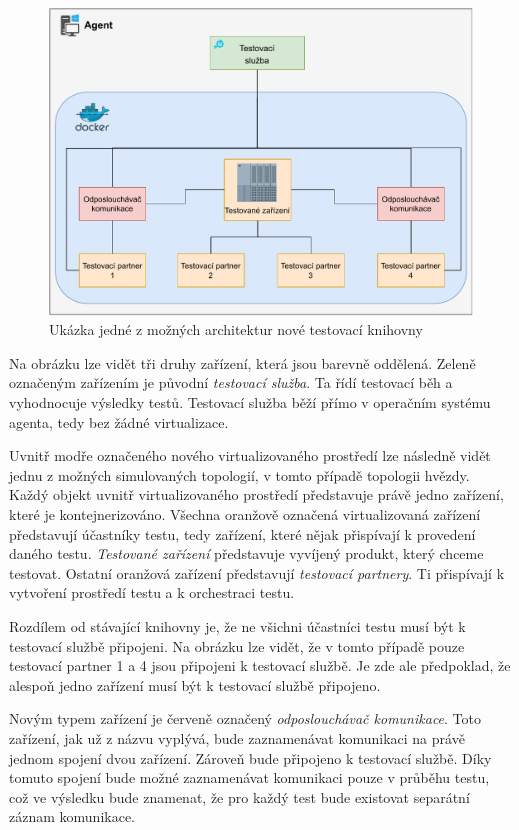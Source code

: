 \begin{figure}[htbp]
    \centering 
    \includegraphics[width=\textwidth]{assets/img/architecture.pdf}
    \caption{Ukázka jedné z možných architektur nové testovací knihovny}
    \label{fig:architecture}
\end{figure}

Na obrázku lze vidět tři druhy zařízení, která jsou barevně oddělená. Zeleně označeným zařízením je původní \textit{testovací služba}. Ta řídí testovací běh a vyhodnocuje výsledky testů. Testovací služba běží přímo v operačním systému agenta, tedy bez žádné virtualizace. 

Uvnitř modře označeného nového virtualizovaného prostředí lze následně vidět jednu z možných simulovaných topologií, v tomto případě topologii hvězdy. Každý objekt uvnitř virtualizovaného prostředí představuje právě jedno zařízení, které je kontejnerizováno. Všechna oranžově označená virtualizovaná zařízení představují účastníky testu, tedy zařízení, které nějak přispívají k provedení daného testu. \textit{Testované zařízení} představuje vyvíjený produkt, který chceme testovat. Ostatní oranžová zařízení představují \textit{testovací partnery}. Ti přispívají k vytvoření prostředí testu a k orchestraci testu.

Rozdílem od stávající knihovny je, že ne všichni účastníci testu musí být k testovací službě připojeni. Na obrázku lze vidět, že v tomto případě pouze testovací partner 1 a 4 jsou připojeni k testovací službě. Je zde ale předpoklad, že alespoň jedno zařízení musí být k testovací službě připojeno.

Novým typem zařízení je červeně označený \textit{odposlouchávač komunikace}. Toto zařízení, jak už z názvu vyplývá, bude zaznamenávat komunikaci na právě jednom spojení dvou zařízení. Zároveň bude připojeno k testovací službě. Díky tomuto spojení bude možné zaznamenávat komunikaci pouze v průběhu testu, což ve výsledku bude znamenat, že pro každý test bude existovat separátní záznam komunikace.



